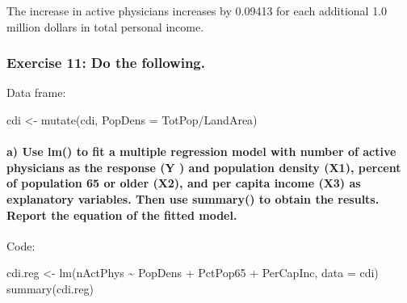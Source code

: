 \documentclass[
]{article}
\newenvironment{Shaded}{\begin{snugshade}}{\end{snugshade}}
\newcommand{\AttributeTok}[1]{\textcolor[rgb]{0.77,0.63,0.00}{#1}}
\newcommand{\FunctionTok}[1]{\textcolor[rgb]{0.00,0.00,0.00}{#1}}
\newcommand{\NormalTok}[1]{#1}
\newcommand{\OtherTok}[1]{\textcolor[rgb]{0.56,0.35,0.01}{#1}}
\newcommand{\SpecialCharTok}[1]{\textcolor[rgb]{0.00,0.00,0.00}{#1}}
\begin{document}
\hfill\break
The increase in active physicians increases by 0.09413 for each
additional 1.0 million dollars in total personal income.

\hypertarget{exercise-11-do-the-following.}{%
\subsubsection{Exercise 11: Do the
following.}\label{exercise-11-do-the-following.}}

\hfill\break
Data frame:

\begin{Shaded}
\begin{Highlighting}[]
\NormalTok{cdi }\OtherTok{\textless{}{-}} \FunctionTok{mutate}\NormalTok{(cdi, }\AttributeTok{PopDens =}\NormalTok{ TotPop}\SpecialCharTok{/}\NormalTok{LandArea)}
\end{Highlighting}
\end{Shaded}

\newpage

\hypertarget{a-use-lm-to-fit-a-multiple-regression-model-with-number-of-active-physicians-as-the-response-y-and-population-density-x1-percent-of-population-65-or-older-x2-and-per-capita-income-x3-as-explanatory-variables.-then-use-summary-to-obtain-the-results.-report-the-equation-of-the-fitted-model.}{%
\paragraph{a) Use lm() to fit a multiple regression model with number of
active physicians as the response (Y ) and population density (X1),
percent of population 65 or older (X2), and per capita income (X3) as
explanatory variables. Then use summary() to obtain the results. Report
the equation of the fitted
model.}\label{a-use-lm-to-fit-a-multiple-regression-model-with-number-of-active-physicians-as-the-response-y-and-population-density-x1-percent-of-population-65-or-older-x2-and-per-capita-income-x3-as-explanatory-variables.-then-use-summary-to-obtain-the-results.-report-the-equation-of-the-fitted-model.}}

\hfill\break
Code:

\begin{Shaded}
\begin{Highlighting}[]
\NormalTok{cdi.reg }\OtherTok{\textless{}{-}} \FunctionTok{lm}\NormalTok{(nActPhys }\SpecialCharTok{\textasciitilde{}}\NormalTok{ PopDens }\SpecialCharTok{+}\NormalTok{ PctPop65 }\SpecialCharTok{+}\NormalTok{ PerCapInc, }\AttributeTok{data =}\NormalTok{ cdi)}
\FunctionTok{summary}\NormalTok{(cdi.reg)}
\end{Highlighting}
\end{Shaded}
\end{document}
